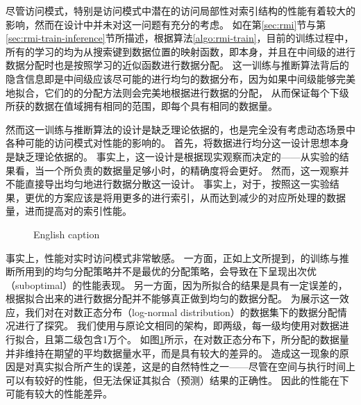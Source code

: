 尽管访问模式，特别是访问模式中潜在的访问局部性对索引结构的性能有着较大的影响，然而{\li}在设计中并未对这一问题有充分的考虑。
如在第\ref{sec:rmi}节与第\ref{sec:rmi-train-inference}节所描述，根据算法\ref{algo:rmi-train}，目前{\rmi}的训练过程中，
所有的{\model}学习的均为从搜索键到数据位置的映射函数，即{\cdf}本身，并且在中间级的{\model}进行数据分配时也是按照学习的{\cdf}近似函数进行数据分配。
这一训练与推断算法背后的隐含信息即是中间级{\model}应该尽可能的进行均匀的数据分布，因为如果中间级{\model}能够完美地拟合{\cdf}，它们的的分配方法则会完美地根据{\cdf}进行数据的分配，
从而保证每个下级{\model}所获的数据在{\cdf}值域拥有相同的范围，即每个{\model}具有相同的数据量。

然而这一{\rmi}训练与推断算法的设计是缺乏理论依据的，也是完全没有考虑动态场景中各种可能的访问模式对{\li}性能的影响的。
首先，将数据进行均分这一设计思想本身是缺乏理论依据的。
事实上，这一设计是根据现实观察而决定的{------}从实验的结果看，当一个{\model}所负责的数据量足够小时，{\model}的精确度将会更好。
然而，这一观察并不能直接导出均匀地进行数据分散这一设计。
事实上，对于{\skewacc}，按照这一实验结果，更优的方案应该是将{\hotkey}用更多的{\model}进行索引，从而达到减少{\hotkey}的对应{\model}所处理的数据量，进而提高对{\hotkey}的索引性能。

\begin{figure}[!htp]
  \centering
    {English caption}
  \label{fig:rmi-dispatch}
\end{figure}

事实上，{\li}性能对实时访问模式非常敏感。
一方面，正如上文所提到，{\rmi}的训练与推断所用到的均匀分配策略并不是最优的分配策略，会导致在{\skewacc}下呈现出次优（suboptimal）的性能表现。
另一方面，因为{\rmi}所拟合的{\cdf}结果是具有一定误差的，根据拟合出来的{\cdf}进行数据分配并不能够真正做到均匀的数据分配。
为展示这一效应，我们对{\rmi}在对数正态分布（log-normal distribution）的数据集下的数据分配情况进行了探究。
我们使用与原论文相同的{\rmi}架构，即两级{\rmi}，每一级均使用{\lr}对数据进行拟合，且第二级包含1万个{\model}。
如图\ref{fig:rmi-dispatch}所示，在对数正态分布下，{\model}所分配的数据量并非维持在期望的平均数据量水平，而是具有较大的差异的。
造成这一现象的原因是{\model}对真实{\cdf}拟合所产生的误差，这是{\model}的自然特性之一{------}尽管{\model}在空间与执行时间上可以有较好的性能，但{\model}无法保证其拟合（预测）结果的正确性。
因此{\rmi}的性能在{\skewacc}下可能有较大的性能差异。

